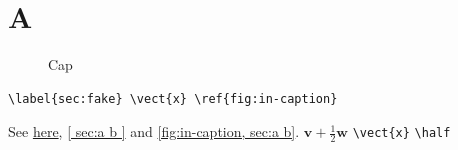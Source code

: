 \documentclass{article}
\newcommand*\vect[1]{\mathbf{#1}}
\def\half{\frac{1}{2}}
\begin{document}
\section{A}\label{sec:a b}
\begin{figure}\caption{Cap \label{fig:in-caption}}\end{figure}
\begin{verbatim}
\label{sec:fake} \vect{x} \ref{fig:in-caption}
\end{verbatim}
See \hyperref[sec:a b]{here}, \ref{ sec:a b } and \cref{fig:in-caption,
  sec:a b}.
\cite[see][p.~\pageref{fig:in-caption}]{lamport94}
$\vect{v} + \half \vect {w}$ \verb|\vect{x}|
\lstinline!\half!
\end{document}
